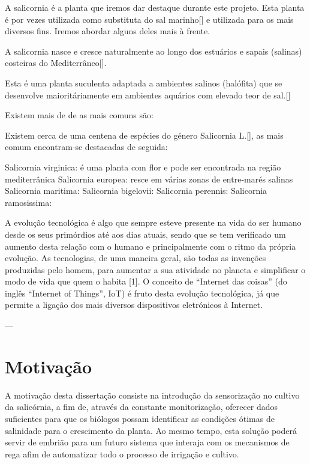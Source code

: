 A salicornia é a planta que iremos dar destaque durante este projeto. Esta planta é por vezes utilizada como substituta do sal marinho[] e utilizada para os mais diversos fins. Iremos abordar alguns deles mais à frente. 

A salicornia nasce e cresce naturalmente ao longo dos estuários e sapais (salinas) costeiras do Mediterrâneo[]. 





Esta é uma planta suculenta adaptada a ambientes salinos (halófita) que se desenvolve maioritáriamente em ambientes aquários com elevado teor de sal.[] 






Existem mais de  de  as mais comuns são: 






Existem cerca de uma centena de espécies do género Salicornia L.[], as mais comum encontram-se destacadas de seguida: 

Salicornia virginica: é uma planta com flor e pode ser encontrada na região mediterrânica
Salicornia europea: resce em várias zonas de entre-marés salinas 
Salicornia maritima: 
Salicornia bigelovii: 
Salicornia perennis: 
Salicornia ramosissima: 






A evolução tecnológica é algo que sempre esteve presente na vida do ser humano desde os seus primórdios até aos dias atuais, sendo que se tem verificado um aumento desta relação com o humano e principalmente com o ritmo da própria evolução.  As tecnologias, de uma maneira geral, são todas as invenções produzidas pelo homem, para aumentar a sua atividade no planeta e simplificar o modo de vida que quem o habita [1]. O conceito de “Internet das coisas” (do inglês “Internet of Things”, IoT) é fruto desta evolução tecnológica, já que permite a ligação dos mais diversos dispositivos eletrónicos à Internet. 








---

\section{Motivação}

A motivação desta dissertação consiste na introdução da sensorização no cultivo da salicórnia, a fim de, através da constante monitorização, oferecer dados suficientes para que os biólogos possam identificar as condições ótimas de salinidade para o crescimento da planta. Ao mesmo tempo, esta solução poderá servir de embrião para um futuro sistema que interaja com os mecanismos de rega afim de automatizar todo o processo de irrigação e cultivo.



